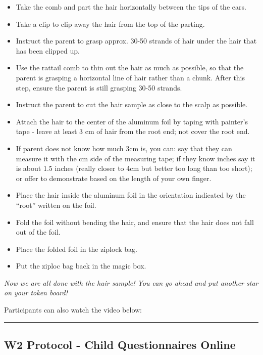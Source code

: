 \documentclass[
]{book}
\begin{document}
\begin{itemize}
\item
  Take the comb and part the hair horizontally between the tips of the ears.
\item
  Take a clip to clip away the hair from the top of the parting.
\item
  Instruct the parent to grasp approx. 30-50 strands of hair under the hair that has been clipped up.
\item
  Use the rattail comb to thin out the hair as much as possible, so that the parent is grasping a horizontal line of hair rather than a chunk. After this step, ensure the parent is still grasping 30-50 strands.
\item
  Instruct the parent to cut the hair sample as close to the scalp as possible.
\item
  Attach the hair to the center of the aluminum foil by taping with painter's tape - leave at least 3 cm of hair from the root end; not cover the root end.
\item
  If parent does not know how much 3cm is, you can: say that they can measure it with the cm side of the measuring tape; if they know inches say it is about 1.5 inches (really closer to 4cm but better too long than too short); or offer to demonstrate based on the length of your own finger.
\item
  Place the hair inside the aluminum foil in the orientation indicated by the ``root'' written on the foil.
\item
  Fold the foil without bending the hair, and ensure that the hair does not fall out of the foil.
\item
  Place the folded foil in the ziplock bag.
\item
  Put the ziploc bag back in the magic box.
\end{itemize}

\emph{Now we are all done with the hair sample! You can go ahead and put another star on your token board!}

Participants can also watch the video below:

\begin{center}\rule{0.5\linewidth}{0.5pt}\end{center}

\hypertarget{w2-protocol---child-questionnaires-online}{%
\subsection{W2 Protocol - Child Questionnaires Online}\label{w2-protocol---child-questionnaires-online}}
\end{document}
